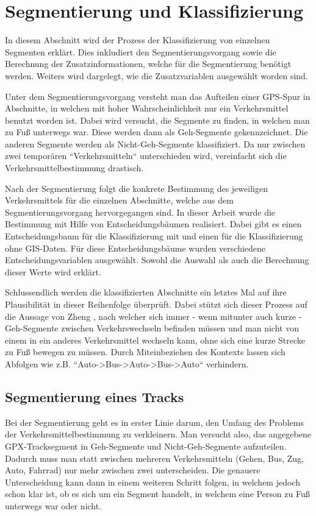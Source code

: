 \chapter{Segmentierung und Klassifizierung}
In diesem Abschnitt wird der Prozess der Klassifizierung von einzelnen Segmenten erklärt. Dies inkludiert den Segmentierungsvorgang sowie die Berechnung der Zusatzinformationen, welche für die Segmentierung benötigt werden. Weiters wird dargelegt, wie die Zusatzvariablen  ausgewählt worden sind. 

Unter dem Segmentierungsvorgang versteht man das Aufteilen einer GPS-Spur in Abschnitte, in welchen mit hoher Wahrscheinlichkeit nur ein Verkehrsmittel benutzt worden ist. Dabei wird versucht, die Segmente zu finden, in welchen man zu Fuß unterwegs war. Diese werden dann als Geh-Segmente gekennzeichnet. Die anderen Segmente werden als Nicht-Geh-Segmente klassifiziert. Da nur zwischen zwei temporären ``Verkehrsmitteln`` unterschieden wird, vereinfacht sich die  Verkehrsmittelbestimmung drastisch.

Nach der Segmentierung folgt die konkrete Bestimmung des jeweiligen Verkehrsmittels für die einzelnen Abschnitte, welche aus dem Segmentierungsvorgang hervorgegangen sind. In dieser Arbeit wurde die Bestimmung mit Hilfe von Entscheidungsbäumen realisiert. Dabei gibt es einen Entscheidungsbaum für die Klassifizierung mit und einen für die Klassifizierung ohne GIS-Daten. Für diese Entscheidungsbäume wurden verschiedene Entscheidungsvariablen ausgewählt. Sowohl die Auswahl als auch die Berechnung dieser Werte wird erklärt.

Schlussendlich werden die klassifizierten Abschnitte ein letztes Mal auf ihre Plausibilität in dieser Reihenfolge überprüft. Dabei stützt sich dieser Prozess auf die Aussage von Zheng \cite{zheng_understanding_2010}, nach welcher sich immer - wenn mitunter auch kurze - Geh-Segmente zwischen Verkehrswechseln befinden müssen und man nicht von einem in ein anderes Verkehrsmittel wechseln kann, ohne sich eine kurze Strecke zu Fuß bewegen zu müssen. Durch Miteinbeziehen des Kontexts lassen sich Abfolgen wie z.B. ``Auto->Bus->Auto->Bus->Auto`` verhindern.  

\section{Segmentierung eines Tracks}
\label{segmentierung}
Bei der Segmentierung geht es in erster Linie darum, den Umfang des Problems der Verkehrsmittelbestimmung zu verkleinern. Man versucht also, das angegebene GPX-Tracksegment in Geh-Segmente und Nicht-Geh-Segmente aufzuteilen. Dadurch muss man statt zwischen mehreren Verkehrsmitteln (Gehen, Bus, Zug, Auto, Fahrrad) nur mehr zwischen zwei unterscheiden. Die genauere Unterscheidung kann dann in einem weiteren Schritt folgen, in welchem jedoch schon klar ist, ob es sich um ein Segment handelt, in welchem eine Person zu Fuß unterwegs war oder nicht. 

